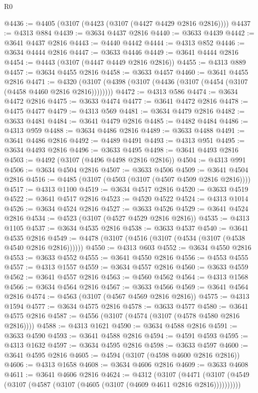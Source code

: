 \begin{lexlean}{R0}
\begin{coremodule}
@4436 := @4405 (@3107 (@4423 (@3107 (@4427 @4429 @2816 @2816))))
@4437 := @4313 @884
@4439 := @3634 @4437 @2816
@4440 := @3633 @4439
@4442 := @3641 @4437 @2816
@4443 := @4440 @4442
@4444 := @4313 @852
@4446 := @3634 @4444 @2816
@4447 := @3633 @4446
@4449 := @3641 @4444 @2816
@4454 := @4443 (@3107 (@4447 @4449 @2816 @2816))
@4455 := @4313 @889
@4457 := @3634 @4455 @2816
@4458 := @3633 @4457
@4460 := @3641 @4455 @2816
@4471 := @4320 (@3107 (@4398 (@3107 (@4436 (@3107 (@4454 (@3107 (@4458 @4460 @2816 @2816))))))))
@4472 := @4313 @586
@4474 := @3634 @4472 @2816
@4475 := @3633 @4474
@4477 := @3641 @4472 @2816
@4478 := @4475 @4477
@4479 := @4313 @569
@4481 := @3634 @4479 @2816
@4482 := @3633 @4481
@4484 := @3641 @4479 @2816
@4485 := @4482 @4484
@4486 := @4313 @959
@4488 := @3634 @4486 @2816
@4489 := @3633 @4488
@4491 := @3641 @4486 @2816
@4492 := @4489 @4491
@4493 := @4313 @951
@4495 := @3634 @4493 @2816
@4496 := @3633 @4495
@4498 := @3641 @4493 @2816
@4503 := @4492 (@3107 (@4496 @4498 @2816 @2816))
@4504 := @4313 @991
@4506 := @3634 @4504 @2816
@4507 := @3633 @4506
@4509 := @3641 @4504 @2816
@4516 := @4485 (@3107 (@4503 (@3107 (@4507 @4509 @2816 @2816))))
@4517 := @4313 @1100
@4519 := @3634 @4517 @2816
@4520 := @3633 @4519
@4522 := @3641 @4517 @2816
@4523 := @4520 @4522
@4524 := @4313 @1014
@4526 := @3634 @4524 @2816
@4527 := @3633 @4526
@4529 := @3641 @4524 @2816
@4534 := @4523 (@3107 (@4527 @4529 @2816 @2816))
@4535 := @4313 @1105
@4537 := @3634 @4535 @2816
@4538 := @3633 @4537
@4540 := @3641 @4535 @2816
@4549 := @4478 (@3107 (@4516 (@3107 (@4534 (@3107 (@4538 @4540 @2816 @2816))))))
@4550 := @4313 @603
@4552 := @3634 @4550 @2816
@4553 := @3633 @4552
@4555 := @3641 @4550 @2816
@4556 := @4553 @4555
@4557 := @4313 @1557
@4559 := @3634 @4557 @2816
@4560 := @3633 @4559
@4562 := @3641 @4557 @2816
@4563 := @4560 @4562
@4564 := @4313 @1568
@4566 := @3634 @4564 @2816
@4567 := @3633 @4566
@4569 := @3641 @4564 @2816
@4574 := @4563 (@3107 (@4567 @4569 @2816 @2816))
@4575 := @4313 @1594
@4577 := @3634 @4575 @2816
@4578 := @3633 @4577
@4580 := @3641 @4575 @2816
@4587 := @4556 (@3107 (@4574 (@3107 (@4578 @4580 @2816 @2816))))
@4588 := @4313 @1621
@4590 := @3634 @4588 @2816
@4591 := @3633 @4590
@4593 := @3641 @4588 @2816
@4594 := @4591 @4593
@4595 := @4313 @1632
@4597 := @3634 @4595 @2816
@4598 := @3633 @4597
@4600 := @3641 @4595 @2816
@4605 := @4594 (@3107 (@4598 @4600 @2816 @2816))
@4606 := @4313 @1658
@4608 := @3634 @4606 @2816
@4609 := @3633 @4608
@4611 := @3641 @4606 @2816
@4624 := @4312
    (@3107
      (@4471 (@3107 (@4549 (@3107 (@4587 (@3107 (@4605 (@3107 (@4609 @4611 @2816 @2816))))))))))

\end{coremodule}
\end{lexlean}
